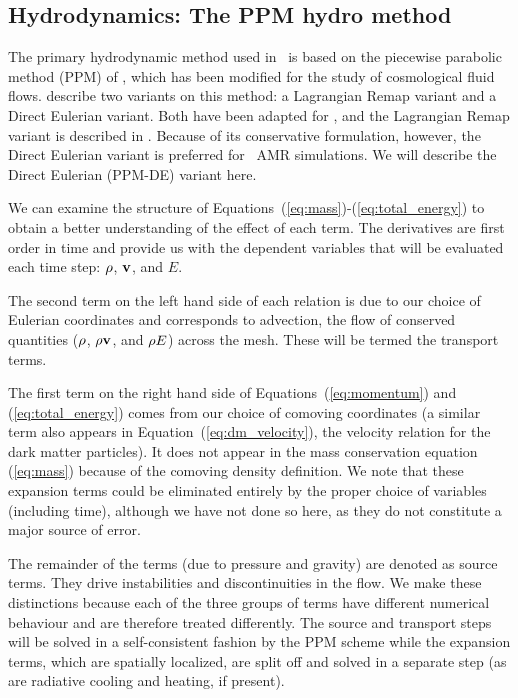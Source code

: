 \subsection{Hydrodynamics: The PPM hydro method}
\label{sec.hydro.ppm}

The primary hydrodynamic method used in \enzo\ is based on the
piecewise parabolic method (PPM) of
\citet{1984JCoPh..54..174C}, which has been
modified for the study of cosmological fluid flows.  
\citet{1984JCoPh..54..174C} describe two variants on this method: a
Lagrangian Remap variant and a Direct Eulerian variant.  Both have
been adapted for \enzo, and the Lagrangian Remap 
variant is described in \citet{1995CoPhC..89..149B}.  Because of its
conservative formulation, however, the Direct Eulerian variant is
preferred for \enzo\ AMR simulations.  We will describe the Direct
Eulerian (PPM-DE) variant here.

We can examine the structure of Equations~(\ref{eq:mass})-(\ref{eq:total_energy})
to obtain a better understanding of the effect of each term.
The derivatives are first order in time
and provide us with the dependent variables that will be evaluated each
time step: $\rho$, $\mathbf{v}$, and $E$.

The second term on the left hand side of each relation
is due to our choice of Eulerian coordinates and corresponds to
advection, the flow of conserved quantities 
($\rho$, $\rho \mathbf{v}$, and $\rho E$) 
across the mesh.  These will be termed the transport terms.

The first term on the right hand side of Equations~(\ref{eq:momentum}) and
(\ref{eq:total_energy}) comes from our choice of comoving coordinates
(a similar term also appears in Equation~(\ref{eq:dm_velocity}), the velocity 
relation for the dark matter particles).  It does not
appear in the mass conservation equation (\ref{eq:mass}) because
of the comoving density definition.   
We note that these expansion terms could be
eliminated entirely by the proper choice of variables (including time),
although we have not done so here, as they do not constitute a major
source of error.

The remainder of the terms (due to pressure and gravity) are denoted as
source terms.  They drive instabilities and discontinuities in the flow.
We make these distinctions because each of the three
groups of terms have different numerical behaviour and are therefore
treated differently.  The source and transport steps will be solved in
a self-consistent fashion by the PPM scheme while the expansion terms,
which are spatially localized, are split off and solved in a separate step
(as are radiative cooling and heating, if present).  

